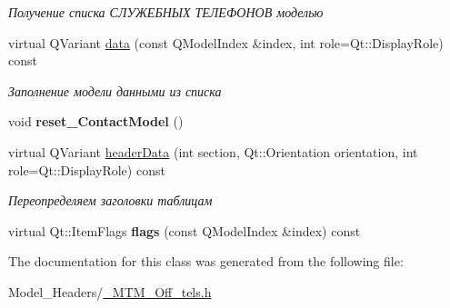 \begin{DoxyCompactItemize}
\begin{DoxyCompactList}\small\item\em Получение списка СЛУЖЕБНЫХ ТЕЛЕФОНОВ моделью \end{DoxyCompactList}\item 
\mbox{\label{class_m_t_m___off___tels_a37a124b24e0a110f7d0617b0015762dd}} 
virtual Q\+Variant \mbox{\hyperlink{class_m_t_m___off___tels_a37a124b24e0a110f7d0617b0015762dd}{data}} (const Q\+Model\+Index \&index, int role=Qt\+::\+Display\+Role) const
\begin{DoxyCompactList}\small\item\em Заполнение модели данными из списка \end{DoxyCompactList}\item 
\mbox{\label{class_m_t_m___off___tels_a5cff0d57e63dc886ac97ea7d0f4b76bf}} 
void {\bfseries reset\+\_\+\+Contact\+Model} ()
\item 
\mbox{\label{class_m_t_m___off___tels_a0c91ba0ec6fac234d8f8ac4f90b56df9}} 
virtual Q\+Variant \mbox{\hyperlink{class_m_t_m___off___tels_a0c91ba0ec6fac234d8f8ac4f90b56df9}{header\+Data}} (int section, Qt\+::\+Orientation orientation, int role=Qt\+::\+Display\+Role) const
\begin{DoxyCompactList}\small\item\em Переопределяем заголовки таблицам \end{DoxyCompactList}\item 
\mbox{\label{class_m_t_m___off___tels_a2719f140857ca012d7f7fa9a90e9323b}} 
virtual Qt\+::\+Item\+Flags {\bfseries flags} (const Q\+Model\+Index \&index) const
\end{DoxyCompactItemize}


The documentation for this class was generated from the following file\+:\begin{DoxyCompactItemize}
\item 
Model\+\_\+\+Headers/\mbox{\hyperlink{___m_t_m___off__tels_8h}{\+\_\+\+M\+T\+M\+\_\+\+Off\+\_\+tels.\+h}}\end{DoxyCompactItemize}
